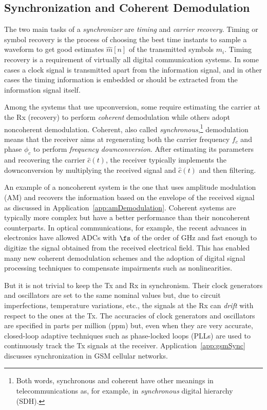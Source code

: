 \subsection{Synchronization and Coherent Demodulation}

The two main tasks of a \emph{synchronizer} are \emph{timing} and \emph{carrier recovery}.
Timing or symbol recovery is the process of choosing the best time instants to  sample a waveform to get good estimates $\hat m[n]$ of the transmitted symbols $m_i$. Timing recovery is a requirement of virtually all digital communication systems. In some cases a clock signal is transmitted apart from the information signal, and in other cases the timing information is embedded or should be extracted from the information signal itself.

Among the systems that use upconversion, some require estimating the carrier at the Rx (recovery) to perform \emph{coherent} demodulation while others adopt noncoherent demodulation. 
Coherent, also called \emph{synchronous},\footnote{Both words, synchronous and coherent have other meanings in telecommunications as, for example, in \emph{synchronous} digital hierarchy (SDH).} demodulation means that the receiver aims at regenerating both the carrier frequency $f_c$ and phase $\phi_c$ to perform \emph{frequency downconversion}.
 After estimating its parameters and recovering the carrier $\hat c(t)$, the receiver typically implements the downconversion by multiplying the received signal and $\hat c(t)$ and then filtering. 

An example of a noncoherent system is the one that uses amplitude modulation (AM) and recovers the information based on the envelope of the received signal as discussed in Application~\ref{app:amDemodulation}. Coherent systems are typically more complex but have a better performance than their noncoherent counterparts. In optical communications, for example, the recent advances in electronics have allowed ADCs with $\fs$ of the order of GHz and fast enough to digitize the signal obtained from the received electrical field. This has enabled many new coherent demodulation schemes and the adoption of digital signal processing techniques to compensate impairments such as nonlinearities.

But it is not trivial to keep the Tx and Rx in synchronism. Their clock generators and oscillators are set to the same nominal values but, due to circuit imperfections, temperature variations, etc., the signals at the Rx can \emph{drift} with respect to the ones at the Tx. 
The accuracies of clock generators and oscillators are specified in parts per million (ppm) but, even when they are very accurate, closed-loop adaptive techniques such as phase-locked loops (PLLs) are used to continuously track the Tx signals at the receiver. Application~\ref{app:gsmSync} discusses synchronization in GSM cellular networks.

